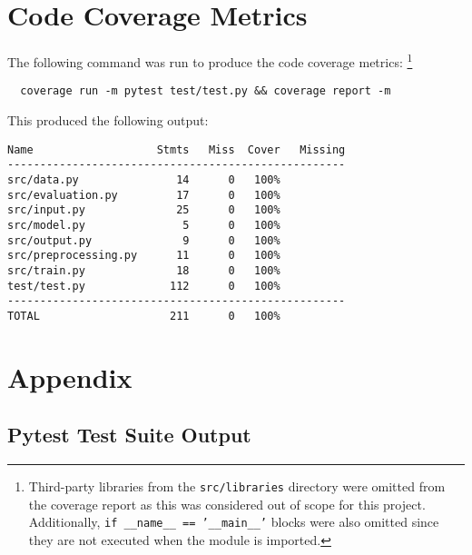 \documentclass[12pt, titlepage]{article}
\begin{document}
\section{Code Coverage Metrics}

The following command was run to produce the code coverage metrics:
\footnote{Third-party libraries from the \texttt{src/libraries} directory were
omitted from the coverage report as this was considered out of scope for this
project. Additionally, \texttt{if \_\_name\_\_ == '\_\_main\_\_'} blocks were
also omitted since they are not executed when the module is imported.}

\begin{verbatim}
  coverage run -m pytest test/test.py && coverage report -m
\end{verbatim}

This produced the following output:

\begin{verbatim}
Name                   Stmts   Miss  Cover   Missing
----------------------------------------------------
src/data.py               14      0   100%
src/evaluation.py         17      0   100%
src/input.py              25      0   100%
src/model.py               5      0   100%
src/output.py              9      0   100%
src/preprocessing.py      11      0   100%
src/train.py              18      0   100%
test/test.py             112      0   100%
----------------------------------------------------
TOTAL                    211      0   100%
\end{verbatim}




\section{Appendix}

\subsection{Pytest Test Suite Output}
\label{sec:pytest-output}
\end{document}

